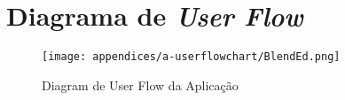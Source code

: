
\chapter{Diagrama de \textit{User Flow}} %

\label{app:userflowchart}

\begin{figure}
    \texttt{[image: appendices/a-userflowchart/BlendEd.png]}
    \caption{Diagram de User Flow da Aplicação}
    \label{fig:userflowchart}
\end{figure}